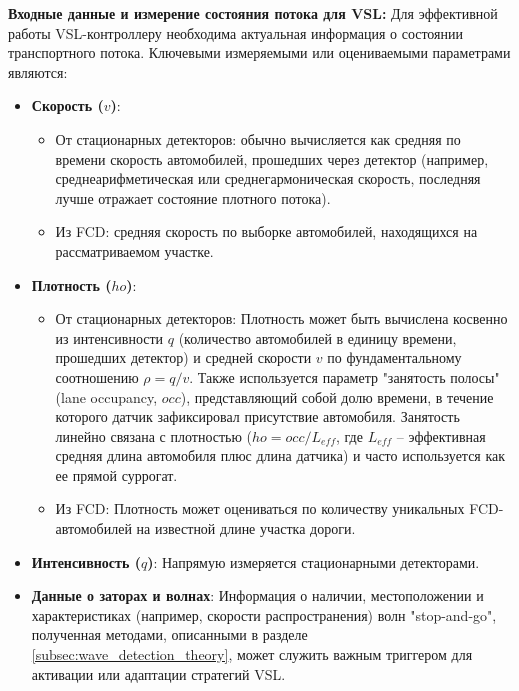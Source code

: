 \documentclass[12pt, a4paper]{article}
\begin{document}
\textbf{Входные данные и измерение состояния потока для VSL:}
Для эффективной работы VSL-контроллеру необходима актуальная информация о состоянии транспортного потока. Ключевыми измеряемыми или оцениваемыми параметрами являются:
\begin{itemize}
    \item \textbf{Скорость ($v$)}: 
        \begin{itemize}
            \item От стационарных детекторов: обычно вычисляется как средняя по времени скорость автомобилей, прошедших через детектор (например, среднеарифметическая или среднегармоническая скорость, последняя лучше отражает состояние плотного потока).
            \item Из FCD: средняя скорость по выборке автомобилей, находящихся на рассматриваемом участке.
        \end{itemize}
    \item \textbf{Плотность ($
ho$)}:
        \begin{itemize}
            \item От стационарных детекторов: Плотность может быть вычислена косвенно из интенсивности $q$ (количество автомобилей в единицу времени, прошедших детектор) и средней скорости $v$ по фундаментальному соотношению $\rho = q/v$. Также используется параметр "занятость полосы" (lane occupancy, $occ$), представляющий собой долю времени, в течение которого датчик зафиксировал присутствие автомобиля. Занятость линейно связана с плотностью ($
ho = occ / L_{eff}$, где $L_{eff}$ – эффективная средняя длина автомобиля плюс длина датчика) и часто используется как ее прямой суррогат.
            \item Из FCD: Плотность может оцениваться по количеству уникальных FCD-автомобилей на известной длине участка дороги.
        \end{itemize}
    \item \textbf{Интенсивность ($q$)}: Напрямую измеряется стационарными детекторами.
    \item \textbf{Данные о заторах и волнах}: Информация о наличии, местоположении и характеристиках (например, скорости распространения) волн "stop-and-go", полученная методами, описанными в разделе \ref{subsec:wave_detection_theory}, может служить важным триггером для активации или адаптации стратегий VSL.
\end{itemize}
\end{document}
